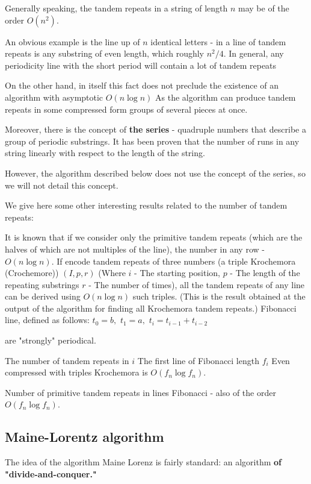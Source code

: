 Generally speaking, the tandem repeats in a string of length $n$ may be of the order $O (n ^ 2)$.

An obvious example is the line up of $n$ identical letters - in a line of tandem repeats is any substring of even length, which roughly $n ^ 2/4$. In general, any periodicity line with the short period will contain a lot of tandem repeats

On the other hand, in itself this fact does not preclude the existence of an algorithm with asymptotic $O (n \log n)$ As the algorithm can produce tandem repeats in some compressed form groups of several pieces at once.

Moreover, there is the concept of \textbf{the series} - quadruple numbers that describe a group of periodic substrings. It has been proven that the number of runs in any string linearly with respect to the length of the string.

However, the algorithm described below does not use the concept of the series, so we will not detail this concept.

We give here some other interesting results related to the number of tandem repeats:

It is known that if we consider only the primitive tandem repeats (which are the halves of which are not multiples of the line), the number in any row - $O (n \log n)$.
If encode tandem repeats of three numbers (a triple Krochemora (Crochemore)) $(I, p, r)$ (Where $i$ - The starting position, $p$ - The length of the repeating substrings $r$ - The number of times), all the tandem repeats of any line can be derived using $O (n \log n)$ such triples. (This is the result obtained at the output of the algorithm for finding all Krochemora tandem repeats.)
Fibonacci line, defined as follows:
$t_0 = b,$
$t_1 = a,$
$t_i = t_ {i-1} + t_ {i-2}$

are "strongly" periodical.

The number of tandem repeats in $i$ The first line of Fibonacci length $f_i$ Even compressed with triples Krochemora is $O (f_n \log f_n)$.

Number of primitive tandem repeats in lines Fibonacci - also of the order $O (f_n \log f_n)$.

\subsection{ Maine-Lorentz algorithm }

The idea of the algorithm Maine Lorenz is fairly standard: an algorithm \textbf{of "divide-and-conquer."}

